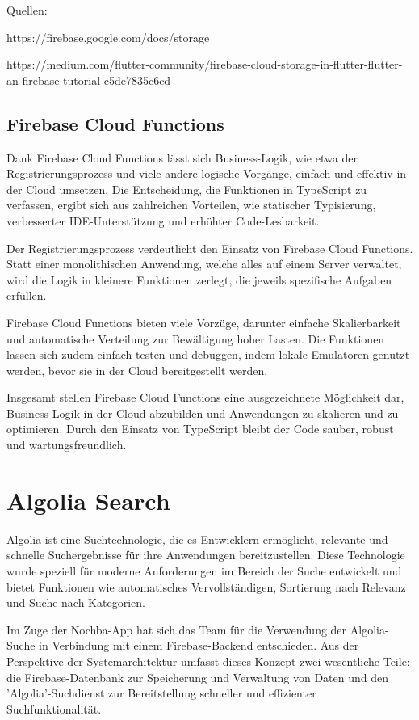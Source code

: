 Quellen:

https://firebase.google.com/docs/storage

https://medium.com/flutter-community/firebase-cloud-storage-in-flutter-flutter-an-firebase-tutorial-c5de7835c6cd

\subsection{Firebase Cloud Functions}
Dank Firebase Cloud Functions\cite{firebase-cloud-functions} lässt sich Business-Logik, wie etwa der Registrierungsprozess und viele andere logische Vorgänge, einfach und effektiv in der Cloud umsetzen. Die Entscheidung, die Funktionen in TypeScript zu verfassen, ergibt sich aus zahlreichen Vorteilen, wie statischer Typisierung, verbesserter IDE-Unterstützung und erhöhter Code-Lesbarkeit.

Der Registrierungsprozess verdeutlicht den Einsatz von Firebase Cloud Functions. Statt einer monolithischen Anwendung, welche alles auf einem Server verwaltet, wird die Logik in kleinere Funktionen zerlegt, die jeweils spezifische Aufgaben erfüllen.

Firebase Cloud Functions bieten viele Vorzüge, darunter einfache Skalierbarkeit und automatische Verteilung zur Bewältigung hoher Lasten. Die Funktionen lassen sich zudem einfach testen und debuggen, indem lokale Emulatoren genutzt werden, bevor sie in der Cloud bereitgestellt werden.

Insgesamt stellen Firebase Cloud Functions eine ausgezeichnete Möglichkeit dar, Business-Logik in der Cloud abzubilden und Anwendungen zu skalieren und zu optimieren. Durch den Einsatz von TypeScript bleibt der Code sauber, robust und wartungsfreundlich.

\section{Algolia Search}\label{sec:algolia}

Algolia ist eine Suchtechnologie, die es Entwicklern ermöglicht, relevante und schnelle Suchergebnisse für ihre Anwendungen bereitzustellen. Diese Technologie wurde speziell für moderne Anforderungen im Bereich der Suche entwickelt und bietet Funktionen wie automatisches Vervollständigen, Sortierung nach Relevanz und Suche nach Kategorien.

Im Zuge der Nochba-App hat sich das Team für die Verwendung der Algolia-Suche in Verbindung mit einem Firebase-Backend entschieden. Aus der Perspektive der Systemarchitektur umfasst dieses Konzept zwei wesentliche Teile: die Firebase-Datenbank zur Speicherung und Verwaltung von Daten und den 'Algolia'-Suchdienst zur Bereitstellung schneller und effizienter Suchfunktionalität.

